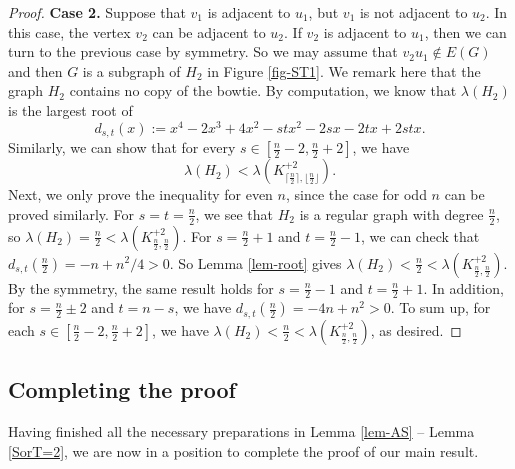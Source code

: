 \documentclass[11pt]{article}
\begin{document}
\begin{proof}
 {\bf Case 2.} 
 Suppose that $v_1$ is adjacent to $u_1$,  
  but $v_1$ is not adjacent to $u_2$. 
  In this case, the vertex $v_2$ can be adjacent to 
  $u_2$.   If $v_2$ is adjacent to $u_1$, then 
  we can turn to the previous case by symmetry. So we may assume that $v_2u_1\notin E(G)$ and 
  then $G$ is a subgraph of $H_2$ in Figure \ref{fig-ST1}. We remark here that the graph $H_2$ contains no copy of the bowtie. By computation, we know that 
  $\lambda (H_2)$ is the largest root of 
\[ d_{s,t}(x) := x^4 - 2 x^3+ 4 x^2 - s t x^2
-2 s x - 2 t x + 2 s t x.  \]  
Similarly, we can show that for every 
$s\in [\frac{n}{2} -2, \frac{n}{2} +2]$, we have 
 \[ \lambda (H_2) 
 < \lambda (K_{\lceil \frac{n}{2} \rceil,\lfloor \frac{n}{2} \rfloor}^{+2}). \] 
Next, we only prove the inequality for even $n$, 
since the case for odd $n$ can be proved similarly. 
 For $s=t=\frac{n}{2}$, we see that 
$H_2$ is a regular graph with degree $\frac{n}{2}$, 
so $\lambda (H_2)= \frac{n}{2} < \lambda (K_{ \frac{n}{2},\frac{n}{2}}^{+2})$. 
  For $s=\frac{n}{2} +1$ and $t=\frac{n}{2} -1$, 
  we can check that $d_{s,t}(\frac{n}{2}) = -n + n^2/4 >0$. 
  So Lemma \ref{lem-root} gives 
   $\lambda (H_2) < \frac{n}{2} < \lambda (K_{ \frac{n}{2},\frac{n}{2}}^{+2})$. 
  By the symmetry, the same result holds for 
  $s=\frac{n}{2}-1$ and $t=\frac{n}{2} +1$. 
  In addition, for $s=\frac{n}{2} \pm 2$ and 
  $t=n-s$, we have $d_{s,t}(\frac{n}{2} ) = -4 n + n^2 >0$. 
  To sum up, for each $s\in [\frac{n}{2}-2, \frac{n}{2} +2]$,   we have $\lambda (H_2) < \frac{n}{2} < \lambda (K_{ \frac{n}{2},\frac{n}{2}}^{+2})$, as desired. 
\end{proof}



\subsection{Completing the proof}

Having finished all the necessary preparations in Lemma \ref{lem-AS} -- 
Lemma \ref{SorT=2}, 
we are now in a position to complete the proof of our main result. 
\end{document}
